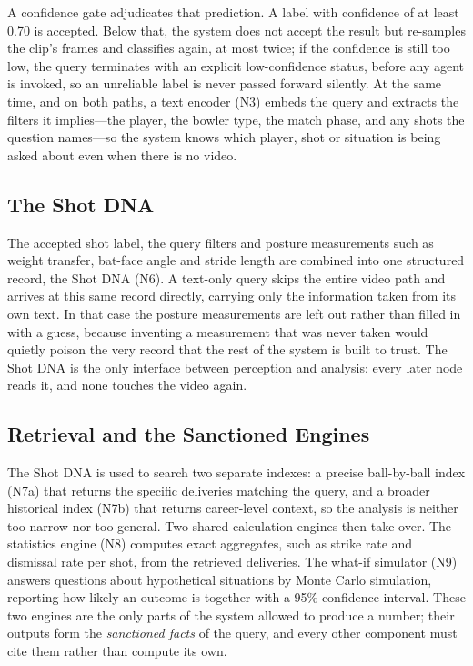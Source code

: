 A confidence gate adjudicates that prediction. A label with confidence of at least 0.70 is accepted. Below that, the system does not accept the result but re-samples the clip's frames and classifies again, at most twice; if the confidence is still too low, the query terminates with an explicit low-confidence status, before any agent is invoked, so an unreliable label is never passed forward silently. At the same time, and on both paths, a text encoder (N3) embeds the query and extracts the filters it implies---the player, the bowler type, the match phase, and any shots the question names---so the system knows which player, shot or situation is being asked about even when there is no video.

\subsection{The Shot DNA}
The accepted shot label, the query filters and posture measurements such as weight transfer, bat-face angle and stride length are combined into one structured record, the Shot DNA (N6). A text-only query skips the entire video path and arrives at this same record directly, carrying only the information taken from its own text. In that case the posture measurements are left out rather than filled in with a guess, because inventing a measurement that was never taken would quietly poison the very record that the rest of the system is built to trust. The Shot DNA is the only interface between perception and analysis: every later node reads it, and none touches the video again.

\subsection{Retrieval and the Sanctioned Engines}
The Shot DNA is used to search two separate indexes: a precise ball-by-ball index (N7a) that returns the specific deliveries matching the query, and a broader historical index (N7b) that returns career-level context, so the analysis is neither too narrow nor too general. Two shared calculation engines then take over. The statistics engine (N8) computes exact aggregates, such as strike rate and dismissal rate per shot, from the retrieved deliveries. The what-if simulator (N9) answers questions about hypothetical situations by Monte Carlo simulation, reporting how likely an outcome is together with a 95\% confidence interval. These two engines are the only parts of the system allowed to produce a number; their outputs form the \emph{sanctioned facts} of the query, and every other component must cite them rather than compute its own.

